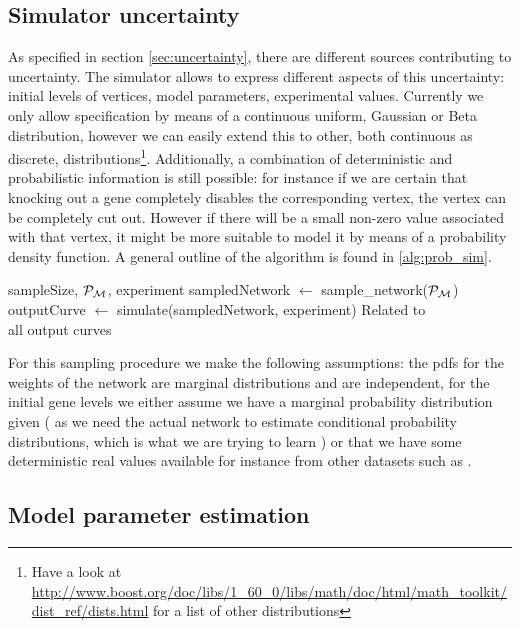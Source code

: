 \documentclass{article}
\begin{document}
\subsection{Simulator uncertainty}
As specified in section \ref{sec:uncertainty}, there are different sources contributing to uncertainty. The simulator allows to express different aspects of this uncertainty: initial levels of vertices, model parameters, experimental values.
Currently we only allow specification by means of a continuous uniform, Gaussian or Beta distribution, however we can easily extend this to other, both continuous as discrete, distributions\footnote{Have a look at \url{http://www.boost.org/doc/libs/1_60_0/libs/math/doc/html/math_toolkit/dist_ref/dists.html}
for a list of other distributions}.	
Additionally, a combination of deterministic and probabilistic information is still possible: for instance if we are certain that knocking out a gene completely disables the corresponding vertex, the vertex can be completely cut out. However if there will be
a small non-zero value associated with that vertex, it might be more suitable to model it by means of a probability density function. A general outline of the algorithm is found in \ref{alg:prob_sim}.
\begin{algorithmic}\label{alg:prob_sim}
  \Require sampleSize, $\mathcal{P}_\mathcal{M}$, experiment
  \State sampledNetwork $\leftarrow$ sample\_network($\mathcal{P}_\mathcal{M}$)
  \State outputCurve $\leftarrow$  simulate(sampledNetwork, experiment) \Comment Related to \label{sec:param_sim}
  \EndFor \\
  \Return all output curves 
  
  \EndFunction 
\end{algorithmic} 
For this sampling procedure we make the following assumptions: the pdfs for the weights of the network are marginal distributions and are independent, for the initial gene levels we either assume we have a 
marginal probability distribution given ( as we need the actual network to estimate conditional probability distributions, which is what we are trying to learn ) or that we have some deterministic real values available for instance from other 
datasets such as \cite{brauer2008coordination}. 

\subsection{Model parameter estimation}
\end{document}
